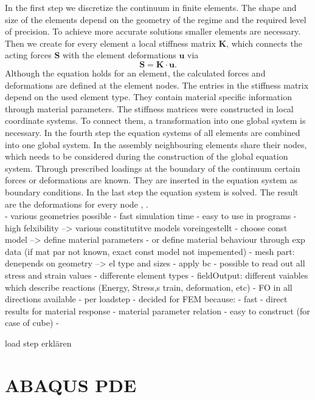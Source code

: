In the first step we discretize the continuum in finite elements. The shape and size of the elements depend on the geometry of the regime and the required level of precision. To achieve more accurate solutions smaller elements are necessary. Then we create for every element a local stiffness matrix $\boldsymbol{K}$, which connects the acting forces $\boldsymbol{S}$ with the element deformations $\boldsymbol{u}$ via 
\begin{equation}
    \boldsymbol{S} =  \boldsymbol{K} \cdot \boldsymbol{u}.
\end{equation}
Although the equation holds for an element, the calculated forces and deformations are defined at the element nodes. The entries in the stiffness matrix depend on the used element type. They contain material specific information through material parameters. The stiffness matrices were constructed in local coordinate systems. To connect them, a transformation into one global system is necessary. In the fourth step the equation systems of all elements are combined into one global system. In the assembly neighbouring elements share their nodes, which needs to be considered during the construction of the global equation system. Through prescribed loadings at the boundary of the continuum certain forces or deformations are known. They are inserted in the equation system as boundary conditions. In the last step the equation system is solved. The result are the deformations for every node \cite{willner_vorlesungsskript_nodate}, \cite{jagota_finite_nodate}. \\





- various geometries possible
- fast simulation time
- easy to use in programs
- high felxibility --> various constitutitve models voreingestellt
- choose const model --> define material parameters 
- or define material behaviour through exp data (if mat par not known, exact const model not impemented)
- mesh part: denepends on geometry --> el type and sizes
- apply bc 
- possible to read out all stress and strain values
- differente element types
- fieldOutput: different vaiables which describe reactions (Energy, Stress,s train, deformation, etc)
- FO in all directions available
- per loadstep
- decided for FEM because:
- fast
- direct results for material response - material parameter relation
- easy to construct (for case of cube)
- 




load step erklären
\section{ABAQUS PDE} \label{sec: AbaqusBasics}
